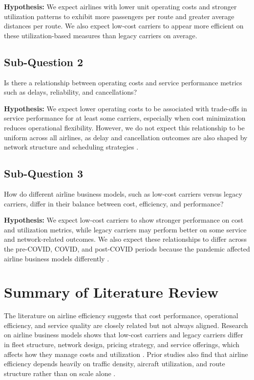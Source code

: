 \documentclass[11pt, letterpaper]{article}
\begin{document}
\textbf{Hypothesis:} We expect airlines with lower unit operating costs and stronger utilization patterns to exhibit more passengers per route and greater average distances per route. We also expect low-cost carriers to appear more efficient on these utilization-based measures than legacy carriers on average\cite{barbot2008, zuidberg2014}.

\subsection{Sub-Question 2}
Is there a relationship between operating costs and service performance metrics such as delays, reliability, and cancellations?

\textbf{Hypothesis:} We expect lower operating costs to be associated with trade-offs in service performance for at least some carriers, especially when cost minimization reduces operational flexibility. However, we do not expect this relationship to be uniform across all airlines, as delay and cancellation outcomes are also shaped by network structure and scheduling strategies \cite{lee2023, mayer2002}.

\subsection{Sub-Question 3}
How do different airline business models, such as low-cost carriers versus legacy carriers, differ in their balance between cost, efficiency, and performance?

\textbf{Hypothesis:} We expect low-cost carriers to show stronger performance on cost and utilization metrics, while legacy carriers may perform better on some service and network-related outcomes. We also expect these relationships to differ across the pre-COVID, COVID, and post-COVID periods because the pandemic affected airline business models differently \cite{fontanet2022, gudmundsson2021}.


\section{Summary of Literature Review}

The literature on airline efficiency suggests that cost performance, operational efficiency, and service quality are closely related but not always aligned. Research on airline business models shows that low-cost carriers and legacy carriers differ in fleet structure, network design, pricing strategy, and service offerings, which affects how they manage costs and utilization \cite{barbot2008, fontanet2022}. Prior studies also find that airline efficiency depends heavily on traffic density, aircraft utilization, and route structure rather than on scale alone \cite{banker1993, caves1984, zuidberg2014}. 
\end{document}
